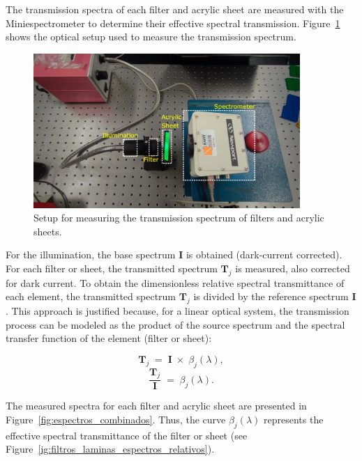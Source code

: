 The transmission spectra of each filter and acrylic sheet are measured with the Miniespectrometer to determine their effective spectral transmission. Figure~\ref{fig:montaje_spec} shows the optical setup used to measure the transmission spectrum.

\begin{figure}[H]
    \centering
    \includegraphics[trim=30mm 0mm 40mm 25mm, clip, width=0.9\textwidth]{Figures/C3/montaje_spec.pdf}
    \caption{Setup for measuring the transmission spectrum of filters and acrylic sheets.}
    \label{fig:montaje_spec}
\end{figure}


\noindent For the illumination, the base spectrum \(\mathbf{I}\) is obtained (dark-current corrected). For each filter or sheet, the transmitted spectrum \(\mathbf{T}_j\) is measured, also corrected for dark current. To obtain the dimensionless relative spectral transmittance of each element, the transmitted spectrum \(\mathbf{T}_j\) is divided by the reference spectrum \(\mathbf{I}\). This approach is justified because, for a linear optical system, the transmission process can be modeled as the product of the source spectrum and the spectral transfer function of the element (filter or sheet):

\begin{equation}
    \mathbf{T}_j \;=\; \mathbf{I} \;\times\; \beta_j(\lambda),
\end{equation}
\begin{equation}
    \frac{\mathbf{T}_j}{\mathbf{I}} \;=\; \beta_j(\lambda).
\end{equation}

\noindent The measured spectra for each filter and acrylic sheet are presented in Figure~\ref{fig:espectros_combinados}. Thus, the curve \(\beta_j(\lambda)\) represents the effective spectral transmittance of the filter or sheet (see Figure~\ref{ig:filtros_laminas_espectros_relativos}).

